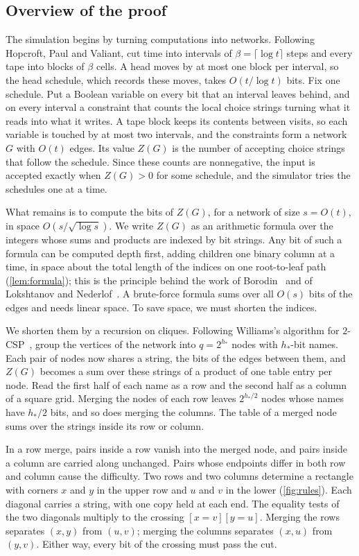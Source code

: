 \documentclass[11pt]{article}
\theoremstyle{definition}
\theoremstyle{definition}
\theoremstyle{remark}
\begin{document}
\subsection{Overview of the proof}\label{sec:overview}

The simulation begins by turning computations into networks. Following Hopcroft, Paul and Valiant, cut time into intervals of $\beta=\lceil\log t\rceil$ steps and every tape into blocks of $\beta$ cells. A head moves by at most one block per interval, so the head schedule, which records these moves, takes $O(t/\log t)$ bits. Fix one schedule. Put a Boolean variable on every bit that an interval leaves behind, and on every interval a constraint that counts the local choice strings turning what it reads into what it writes. A tape block keeps its contents between visits, so each variable is touched by at most two intervals, and the constraints form a network $G$ with $O(t)$ edges. Its value $Z(G)$ is the number of accepting choice strings that follow the schedule. Since these counts are nonnegative, the input is accepted exactly when $Z(G)>0$ for some schedule, and the simulator tries the schedules one at a time.

What remains is to compute the bits of $Z(G)$, for a network of size $s=O(t)$, in space $O(s/\sqrt{\log s})$. We write $Z(G)$ as an arithmetic formula over the integers whose sums and products are indexed by bit strings. Any bit of such a formula can be computed depth first, adding children one binary column at a time, in space about the total length of the indices on one root-to-leaf path (\cref{lem:formula}); this is the principle behind the work of Borodin~\cite{Bor77} and of Lokshtanov and Nederlof~\cite{LN10}. A brute-force formula sums over all $O(s)$ bits of the edges and needs linear space. To save space, we must shorten the indices.

We shorten them by a recursion on cliques. Following Williams's algorithm for $2$-CSP~\cite{Wil05}, group the vertices of the network into $q=2^{h_*}$ nodes with $h_*$-bit names. Each pair of nodes now shares a string, the bits of the edges between them, and $Z(G)$ becomes a sum over these strings of a product of one table entry per node. Read the first half of each name as a row and the second half as a column of a square grid. Merging the nodes of each row leaves $2^{h_*/2}$ nodes whose names have $h_*/2$ bits, and so does merging the columns. The table of a merged node sums over the strings inside its row or column.

In a row merge, pairs inside a row vanish into the merged node, and pairs inside a column are carried along unchanged. Pairs whose endpoints differ in both row and column cause the difficulty. Two rows and two columns determine a rectangle with corners $x$ and $y$ in the upper row and $u$ and $v$ in the lower (\cref{fig:rules}). Each diagonal carries a string, with one copy held at each end. The equality tests of the two diagonals multiply to the crossing $[x=v][y=u]$. Merging the rows separates $(x,y)$ from $(u,v)$; merging the columns separates $(x,u)$ from $(y,v)$. Either way, every bit of the crossing must pass the cut.
\end{document}
